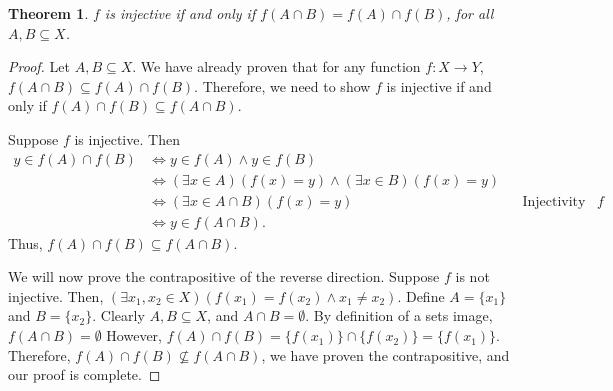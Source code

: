 \documentclass[12pt,a4paper]{article}
\author{Jeremiah Givens}
\theoremstyle{theorem}
\newtheorem{theorem}{Theorem}
\theoremstyle{definition}
\begin{document}
\begin{theorem}
$f$ is injective if and only if $f(A \cap B) = f(A) \cap f(B)$,  for all $A,B \subseteq X$.
\end{theorem}

\begin{proof}
Let $A,B \subseteq X$.  We have already proven that for any function $f: X \to Y$,  $f(A \cap B) \subseteq f(A) \cap f(B)$.  Therefore,  we need to show $f$ is injective if and only if $f(A) \cap f(B) \subseteq f(A \cap B)$. 

Suppose $f$ is injective.  Then
\begin{align*}
y \in f(A) \cap f(B) &\iff y \in f(A) \land y \in f(B) && \\
&\iff (\exists x \in A)(f(x) = y) \land (\exists x \in B)(f(x) = y) &&\\
&\iff (\exists x \in A \cap B)(f(x) = y) && \text{Injectivity of } f \\
&\iff y \in f(A \cap B) \text{.}
\end{align*}
Thus,  $f(A) \cap f(B) \subseteq f(A \cap B)$. 

We will now prove the contrapositive of the reverse direction.  Suppose $f$ is not injective. Then,  $(\exists x_1,  x_2 \in X)(f(x_1) = f(x_2) \land x_1 \not = x_2)$.  Define $A = \{x_1\}$ and $B = \{x_2\}$.  Clearly $A,B \subseteq X$,  and $A \cap B = \emptyset$.  By definition of  a sets image,  $f(A \cap B) = \emptyset$ However,  $f(A) \cap f(B) = \{f(x_1) \} \cap \{f(x_2)\} = \{f(x_1) \}$.  Therefore,  $f(A) \cap f(B) \not \subseteq f(A \cap B)$,  we have proven the contrapositive,  and our proof is complete.
\end{proof}
\end{document}
